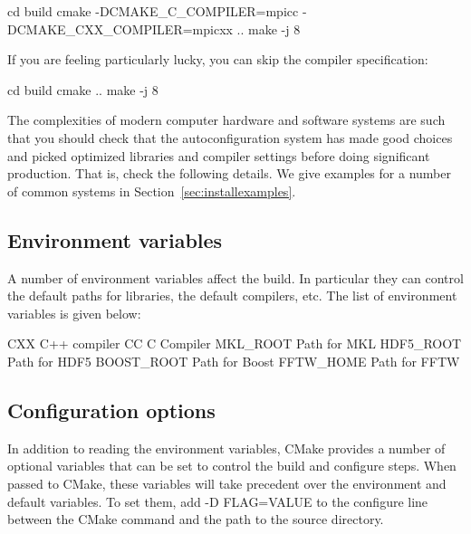 \begin{shade}
cd build
cmake -DCMAKE_C_COMPILER=mpicc -DCMAKE_CXX_COMPILER=mpicxx ..
make -j 8
\end{shade}

If you are feeling particularly lucky, you can skip the compiler specification:

\begin{shade}
cd build
cmake ..
make -j 8
\end{shade}

The complexities of modern computer hardware and software systems are
such that you should check that the autoconfiguration system has made
good choices and picked optimized libraries and compiler settings
before doing significant production. That is, check the following details. We
give examples for a number of common systems in Section~\ref{sec:installexamples}.

\subsection{Environment variables}
\label{sec:envvar}
A number of environment variables affect the build.  In particular
they can control the default paths for libraries, the default
compilers, etc.  The list of environment variables is given below:
%
\begin{shade}
CXX              C++ compiler
CC               C Compiler
MKL_ROOT         Path for MKL
HDF5_ROOT        Path for HDF5
BOOST_ROOT       Path for Boost
FFTW_HOME        Path for FFTW
\end{shade}

\subsection{Configuration options}
\label{sec:cmakeoptions}
In addition to reading the environment variables, CMake provides a
number of optional variables that can be set to control the build and
configure steps.  When passed to CMake, these variables will take
precedent over the environment and default variables.  To set them,
add -D FLAG=VALUE to the configure line between the CMake command and
the path to the source directory.

